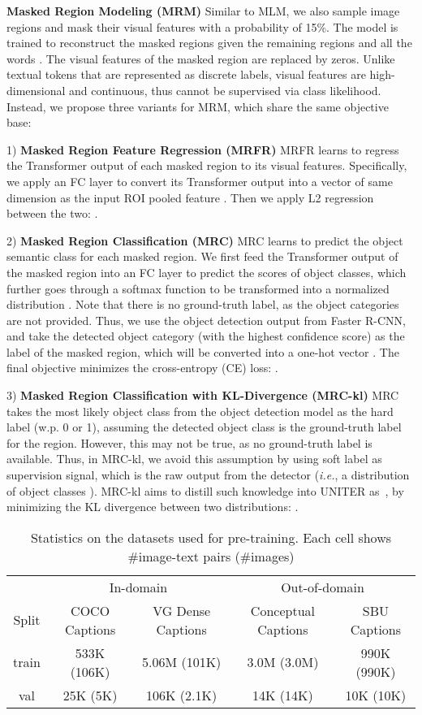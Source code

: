 \documentclass[runningheads]{llncs}
\begin{document}
\noindent \textbf{Masked Region Modeling (MRM)} 
Similar to MLM, we also sample image regions and mask their visual features with a probability of 15\%. 
The model is trained to reconstruct the masked regions  given the remaining regions  and all the words . 
The visual features of the masked region are replaced by zeros.
Unlike textual tokens that are represented as discrete labels, visual features are high-dimensional and continuous, thus cannot be supervised via class likelihood.
Instead, we propose three variants for MRM, which share the same objective base:


1) \textbf{Masked Region Feature Regression (MRFR)} 
MRFR learns to regress the Transformer output of each masked region  to its visual features.
Specifically, we apply an FC layer to convert its Transformer output into a vector  of same dimension as the input ROI pooled feature .
Then we apply L2 regression between the two: . 


2) \textbf{Masked Region Classification (MRC)} 
MRC learns to predict the object semantic class for each masked region.
We first feed the Transformer output of the masked region  into an FC layer to predict the scores of  object classes, which further goes through a softmax function to be transformed into a normalized distribution .
Note that there is no ground-truth label, as the object categories are not provided. Thus, we use the object detection output from Faster R-CNN, and take the detected object category (with the highest confidence score) as the label of the masked region, which will be converted into a one-hot vector .
The final objective minimizes the cross-entropy (CE) loss: 
.


3) \textbf{Masked Region Classification with KL-Divergence (MRC-kl)}
MRC takes the most likely object class from the object detection model as the hard label (w.p. 0 or 1),
assuming the detected object class is the ground-truth label for the region.
However, this may not be true, as no ground-truth label is available.
Thus, in MRC-kl, we avoid this assumption by using soft label as supervision signal, which is the raw output from the detector (\emph{i.e.}, a distribution of object classes  ).
MRC-kl aims to distill such knowledge into UNITER as~\cite{hinton2015distilling}, by minimizing the KL divergence between two distributions: 
. 



\begin{table}[t!]
\centering
\small
\begin{tabular}{c  c c c c}
\hline
& \multicolumn{2}{c}{In-domain} & \multicolumn{2}{c}{Out-of-domain} \\
\cmidrule(lr){2-3} \cmidrule(lr){4-5}
Split & COCO Captions & VG Dense Captions & Conceptual Captions & SBU Captions\\
\hline
train & 533K (106K) & 5.06M (101K) & 3.0M (3.0M) & 990K (990K) \\
val   & 25K (5K) & 106K (2.1K) & 14K (14K) & 10K (10K) \\
\hline
\end{tabular}
\caption{\small{Statistics on the datasets used for pre-training. Each cell shows \#image-text pairs (\#images)}}
\label{table:datasets}
\end{table}
\end{document}
